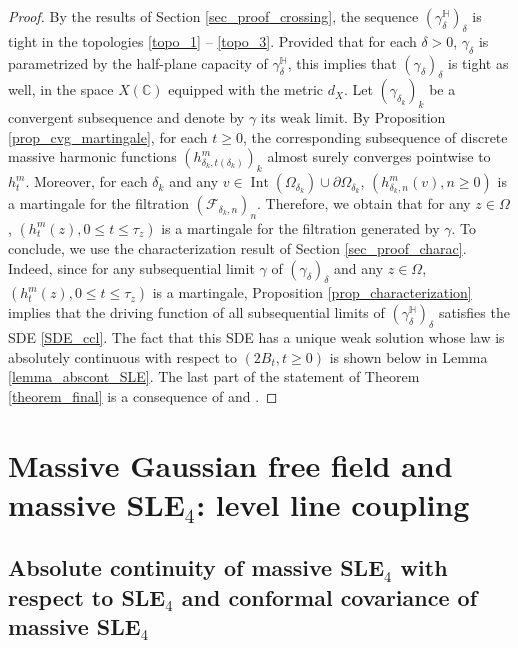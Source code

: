 \documentclass{article}
\newcommand{\HH}{{\mathbb{H}}}
\theoremstyle{definition}
\theoremstyle{remark}
\theoremstyle{remark}
\begin{document}
\begin{proof}
By the results of Section \ref{sec_proof_crossing}, the sequence $(\gamma_{\delta}^{\HH})_{\delta}$ is tight in the topologies \eqref{topo_1} -- \eqref{topo_3}. Provided that for each $\delta > 0$, $\gamma_{\delta}$ is parametrized by the half-plane capacity of $\gamma_{\delta}^{\HH}$, this implies that $(\gamma_{\delta})_{\delta}$ is tight as well, in the space $X(\mathbb{C})$ equipped with the metric $d_X$. Let $(\gamma_{\delta_k})_k$ be a convergent subsequence and denote by $\gamma$ its weak limit. By Proposition \ref{prop_cvg_martingale}, for each $t \geq 0$, the corresponding subsequence of discrete massive harmonic functions $(h_{\delta_k, t(\delta_k)}^m)_k$ almost surely converges pointwise to $h_t^m$. Moreover, for each $\delta_k$ and any $v \in \operatorname{Int}(\Omega_{\delta_k}) \cup \partial \Omega_{\delta_k}$, $(h_{\delta_k, n}^m(v), n \geq 0)$ is a martingale for the filtration $(\mathcal{F}_{\delta_k,n})_n$. Therefore, we obtain that for any $z \in \Omega$, $(h_t^m(z), 0 \leq t \leq \tau_z)$ is a martingale for the filtration generated by $\gamma$. To conclude, we use the characterization result of Section \ref{sec_proof_charac}. Indeed, since for any subsequential limit $\gamma$ of $(\gamma_{\delta})_{\delta}$ and any $z \in \Omega$, $(h_t^m(z), 0 \leq t \leq \tau_z)$ is a martingale, Proposition \ref{prop_characterization} implies that the driving function of all subsequential limits of $(\gamma_{\delta}^{\HH})_{\delta}$ satisfies the SDE \eqref{SDE_ccl}. The fact that this SDE has a unique weak solution whose law is absolutely continuous with respect to $(2B_t, t \geq 0)$ is shown below in Lemma \ref{lemma_abscont_SLE}. The last part of the statement of Theorem \ref{theorem_final} is a consequence of \cite[Corollary~1.8]{Smirnov} and \cite[Theorem~4.2]{Karrila}. 
\end{proof}

\section{Massive Gaussian free field and massive SLE$_4$: level line coupling} \label{sec_coupling}

\subsection{Absolute continuity of massive SLE$_4$ with respect to SLE$_4$ and conformal covariance of massive SLE$_4$} \label{subsec_abs_cov}
\end{document}
